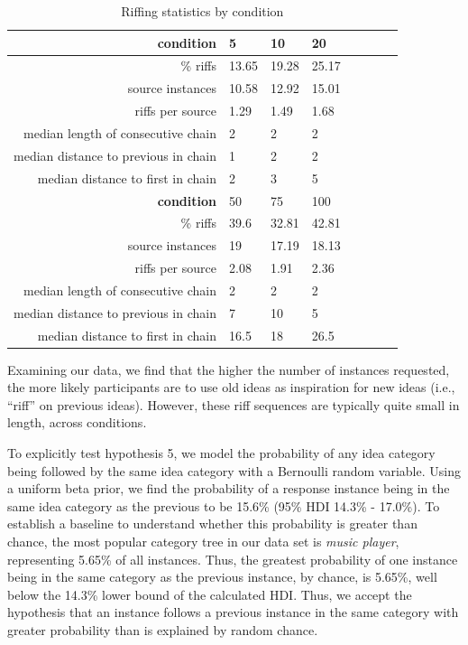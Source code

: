 \begin{table}
\begin{tabular}[h!]{r | l l l l l l l}
    \hline \hline \textbf{condition} & 5 & 10 & 20  \\ \hline \hline
    \% riffs & 13.65 & 19.28 & 25.17  \\
    source instances & 10.58 & 12.92 & 15.01 \\
    riffs per source & 1.29 & 1.49 & 1.68 \\
    median length of consecutive chain & 2 & 2 & 2 \\
    median distance to previous in chain & 1 & 2 & 2 \\
    median distance to first in chain & 2 & 3 & 5 \\ \hline \hline
    \textbf{condition} & 50 & 75 & 100 \\ \hline \hline
    \% riffs & 39.6 & 32.81 & 42.81 \\
    source instances & 19 & 17.19 & 18.13\\
    riffs per source & 2.08 & 1.91 & 2.36\\
    median length of consecutive chain & 2 & 2 & 2\\
    median distance to previous in chain & 7 & 10 & 5\\
    median distance to first in chain & 16.5 & 18 & 26.5 \\
    \end{tabular}
    \caption{Riffing statistics by condition}
\end{table}

Examining our data, we find that the higher the number of instances requested, the more likely participants are to use old ideas as inspiration for new ideas (i.e., ``riff'' on previous ideas). However, these riff sequences are typically quite small in length, across conditions.

To explicitly test hypothesis 5, we model the probability of any idea category being followed by the same idea category with a Bernoulli random variable. Using a uniform beta prior, we find the probability of a response instance being in the same idea category as the previous to be 15.6\% (95\% HDI 14.3\% - 17.0\%). To establish a baseline to understand whether this probability is greater than chance, the most popular category tree in our data set is \emph{music player}, representing 5.65\% of all instances. Thus, the greatest probability of one instance being in the same category as the previous instance, by chance, is 5.65\%, well below the 14.3\% lower bound of the calculated HDI. Thus, we accept the hypothesis that an instance follows a previous instance in the same category with greater probability than is explained by random chance.


